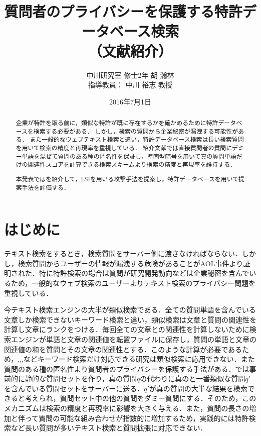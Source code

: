 \documentclass{jsarticle}
\title{質問者のプライバシーを保護する特許データベース検索 \\（文献紹介）}
\author{中川研究室 修士2年 胡 瀚林\\指導教員： 中川 裕志 教授}
\date{2016年7月1日}
\theoremstyle{definition}
\begin{document}
\maketitle
\begin{abstract}
企業が特許を取る前に，類似な特許が既に存在するかを確かめるために特許データベースを検索する必要がある．
しかし，検索の質問から企業秘密が漏洩する可能性がある．
また一般的なウェブテキスト検索と違い，特許データベース検索は長い検索質問を用いて検索の精度と再現率を重視している．
紹介文献\cite{pang_embellishing_2010}では直接質問者の質問にデミー単語を混ぜて質問のある種の匿名性を保証し，準同型暗号を用いて真の質問単語だけの関連性スコアを計算できる検索スキームより検索の精度と再現率を維持する．

本発表では\cite{pang_embellishing_2010}を紹介して，LSIを用いる攻撃手法を提案し，特許データベースを用いて提案手法を評価する．
\end{abstract}

\section{はじめに}
テキスト検索をするとき，検索質問をサーバー側に渡さなければならない．しかし，検索質問からユーザーの情報が漏洩する危険があることがAOL事件\cite{_face_2006}より証明された．特に特許検索の場合は質問が研究開発動向などは企業秘密を含んでいるため，一般的なウェブ検索のユーザーよりテキスト検索のプライバシー問題を重視している．

今テキスト検索エンジンの大半が類似検索である．全ての質問単語を含んでいる文章しか検索できないキーワード検索と違い，類似検索は文章と質問の関連性を計算し文章にランクをつける\cite{zobel_inverted_2006}．毎回全ての文章との関連性を計算しないために検索エンジンが単語と文章の関連値を転置ファイルに保存し，質問の単語と文章の関連値の和を質問とその文章の関連性とする．このような計算が必要であるため，\cite{bethEourt_new_2006},\cite{freedman_keyword_2005},\cite{boneh_public_2004},\cite{song_practical_2000}などキーワード検索だけ対応できる研究は類似検索に応用できない．また質問のある種の匿名性より質問者のプライバシーを保護する手法がある．\cite{murugesan_providing_2009}では事前的に静的な質問セットを作り，真の質問$q$の代わりに真のと一番類似な質問$q'$を含んでいる質問セットをサーバーに送る．$q'$が真の質問の大半な結果を検索できると考えられ，質問セット中の他の質問をダミー質問にする．そのため，このメカニズムは検索の精度と再現率に影響を大きく与える．また，質問の長さの増加と伴って質問の可能な組み合わせが指数的に増加するため，実践的には特許検索など長い質問が多いテキスト検索と質問拡張\cite{qiu_concept_1993,xu_query_1996}に対応できない．
\end{document}
